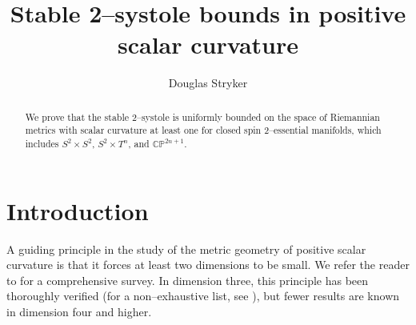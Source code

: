 \documentclass[12pt]{amsart}
\title{Stable 2--systole bounds in positive scalar curvature}
\author{Douglas Stryker}
\theoremstyle{definition}
\numberwithin{equation}{section}
\begin{document}
\begin{abstract}
We prove that the stable 2--systole is uniformly bounded on the space of Riemannian metrics with scalar curvature at least one for closed spin 2--essential manifolds, which includes $S^2 \times S^2$, $S^2 \times T^n$, and $\mathbb{C}\mathbb{P}^{2n+1}$.
\end{abstract}


\maketitle


\section{Introduction}
A guiding principle in the study of the metric geometry of positive scalar curvature is that it forces at least two dimensions to be small. We refer the reader to \cite{Gromov:lectures} for a comprehensive survey. In dimension three, this principle has been thoroughly verified (for a non--exhaustive list, see \cite{Katz:3D, BBN:sys, Liokumovich-Maximo:3D, Munteanu-Wang:3D}), but fewer results are known in dimension four and higher.
\end{document}
